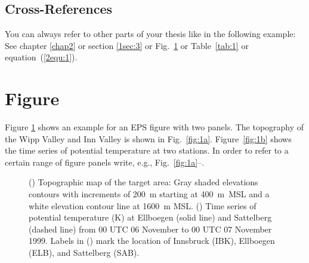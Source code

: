 \subsection{Cross-References}
You can always refer to other parts of your thesis like in the following
example: See chapter \ref{chap2} or section \ref{1sec:3} or
Fig.~\ref{fig:1} or Table~\ref{tab:1} or equation~(\ref{2equ:1}).


\section{Figure}\label{3sec:2}
Figure \ref{fig:1} shows an example for an EPS figure with two panels. The
topography of the Wipp Valley and Inn Valley is shown in Fig.~\ref{fig:1a}.
Figure~\ref{fig:1b} shows the time series of potential temperature at two
stations. In order to refer to a certain range of figure panels write, e.g.,
Fig.~\ref{fig:1a}--.


\begin{figure}[!tp]
\centering
\figuretopcapfalse
{}
\caption{() Topographic map of the target area: Gray shaded
elevations contours with increments of 200~m starting at 400~m~MSL and a white
elevation contour line at 1600~m MSL. () Time series of potential
temperature (K) at Ellboegen (solid line) and Sattelberg (dashed line) from 00
UTC 06 November to 00 UTC 07 November 1999. Labels in () mark the
location of Innsbruck (IBK), Ellboegen (ELB), and Sattelberg
(SAB).}\label{fig:1}
\end{figure}


